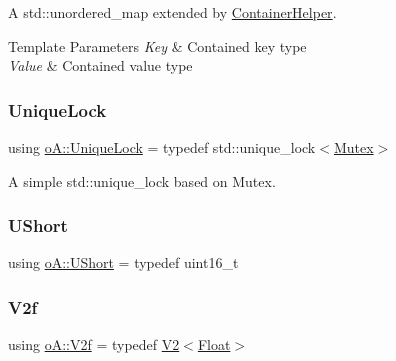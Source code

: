 A std\+::unordered\+\_\+map extended by \mbox{\hyperlink{classo_a_1_1_container_helper}{Container\+Helper}}. 


\begin{DoxyTemplParams}{Template Parameters}
{\em Key} & Contained key type \\
\hline
{\em Value} & Contained value type \\
\hline
\end{DoxyTemplParams}
\mbox{\label{namespaceo_a_a2a6e84e4843983460eace0e5ae899a1e}} 
\subsubsection{\texorpdfstring{Unique\+Lock}{UniqueLock}}
{\footnotesize\ttfamily using \mbox{\hyperlink{namespaceo_a_a2a6e84e4843983460eace0e5ae899a1e}{o\+A\+::\+Unique\+Lock}} = typedef std\+::unique\+\_\+lock$<$\mbox{\hyperlink{namespaceo_a_adc2c4dfe90e78df47ae2e677a4d0f9fa}{Mutex}}$>$}



A simple std\+::unique\+\_\+lock based on Mutex. 

\mbox{\label{namespaceo_a_a0e8a8217ae95045f36575875dcb54537}} 
\subsubsection{\texorpdfstring{U\+Short}{UShort}}
{\footnotesize\ttfamily using \mbox{\hyperlink{namespaceo_a_a0e8a8217ae95045f36575875dcb54537}{o\+A\+::\+U\+Short}} = typedef uint16\+\_\+t}

\mbox{\label{namespaceo_a_a6de6b1704d5ba4ceac954fdebaee0d79}} 
\subsubsection{\texorpdfstring{V2f}{V2f}}
{\footnotesize\ttfamily using \mbox{\hyperlink{namespaceo_a_a6de6b1704d5ba4ceac954fdebaee0d79}{o\+A\+::\+V2f}} = typedef \mbox{\hyperlink{structo_a_1_1_v2}{V2}}$<$\mbox{\hyperlink{namespaceo_a_a513e9cb16924b482268ab3fcdf1f2499}{Float}}$>$}

\mbox{\label{namespaceo_a_aeddbfac9ac1bbff3d9640251439b33aa}} 
